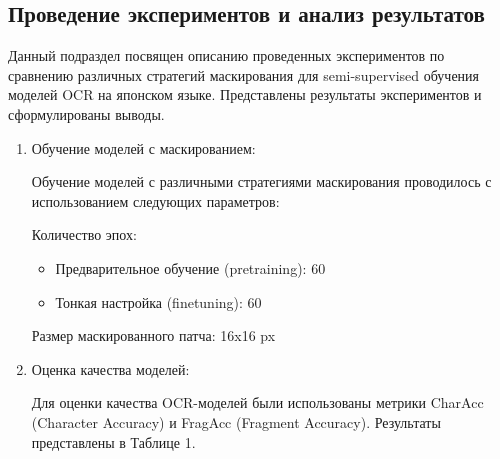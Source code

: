 \subsection{Проведение экспериментов и анализ результатов}

Данный подраздел посвящен описанию проведенных экспериментов по сравнению различных стратегий маскирования для semi-supervised обучения моделей OCR на японском языке. Представлены результаты экспериментов и сформулированы выводы.

\begin{enumerate}
   \item  Обучение моделей с маскированием:
   
   Обучение моделей с различными стратегиями маскирования проводилось с использованием следующих параметров:

   Количество эпох:
   \begin{itemize}
     \item Предварительное обучение (pretraining): 60
     \item Тонкая настройка (finetuning): 60
   \end{itemize}
   
   Размер маскированного патча: 16x16 px

   \item Оценка качества моделей:
   
     Для оценки качества OCR-моделей были использованы метрики CharAcc (Character Accuracy) и FragAcc (Fragment Accuracy). Результаты представлены в Таблице 1. 
     \begin{table}[H]
        \caption{Сравнительный анализ эффективности различных стратегий маскирования на основе экспериментальных данных.}
     \end{table}


\end{enumerate}
